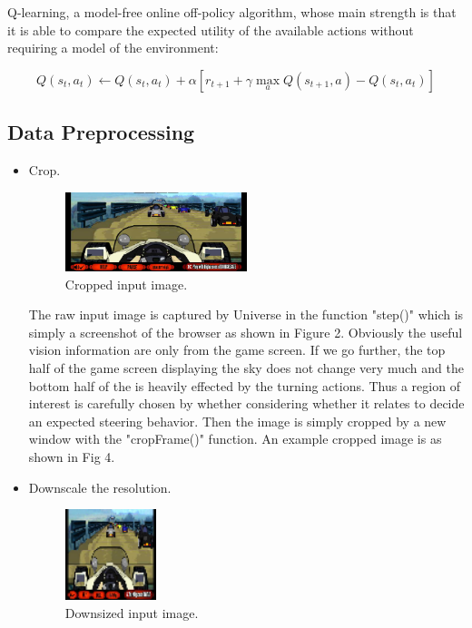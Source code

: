 \documentclass[a4paper]{article}
\begin{document}
Q-learning, a model-free online off-policy algorithm, whose main strength is that it is able to compare the expected utility of the available actions without requiring a model of the environment:

\begin{equation}
        Q(s_t, a_t) \gets Q(s_t, a_t) + \alpha [r_{t+1} + \gamma \max_a Q(s_{t+1}, a) - Q(s_t, a_t)]
\end{equation}

\subsection{Data Preprocessing}

\begin{itemize}

    \item Crop.
    
    	\begin{figure}[h]
   	 \centering
   	 \includegraphics[width=0.5\textwidth]{coaster-racer-vision-cropped}
    	\caption{Cropped input image.}
    	\end{figure}
    
    The raw input image is captured by Universe in the function "step()" which is simply a screenshot of the browser as shown in Figure 2. Obviously the useful vision information are only from the game screen. If we go further, the top half of the game screen displaying the sky does not change very much and the bottom half of the is heavily effected by the turning actions. Thus a region of interest is carefully chosen by whether considering whether it relates to decide an expected steering behavior.  Then the image is simply cropped by a new window with the "cropFrame()" function. An example cropped image is as shown in Fig 4.   
    
    \item Downscale the resolution.

    	\begin{figure}[h]
    	\centering
   	 \includegraphics[width=0.25\textwidth]{coaster-racer-vision-downsized}
   	 \caption{Downsized input image.}
    	\end{figure}
    

\end{itemize}
\end{document}
